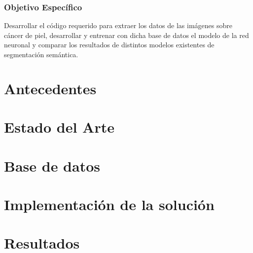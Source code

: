 \subsection{Objetivo Específico}
Desarrollar el código requerido para extraer los datos de las imágenes sobre cáncer de piel, desarrollar y entrenar con dicha base de datos el modelo de la red neuronal y comparar los resultados de distintos modelos existentes de segmentación semántica.

\chapter{Antecedentes}
\chapter{Estado del Arte}
\chapter{Base de datos}
\chapter{Implementación de la solución}
\chapter{Resultados}


